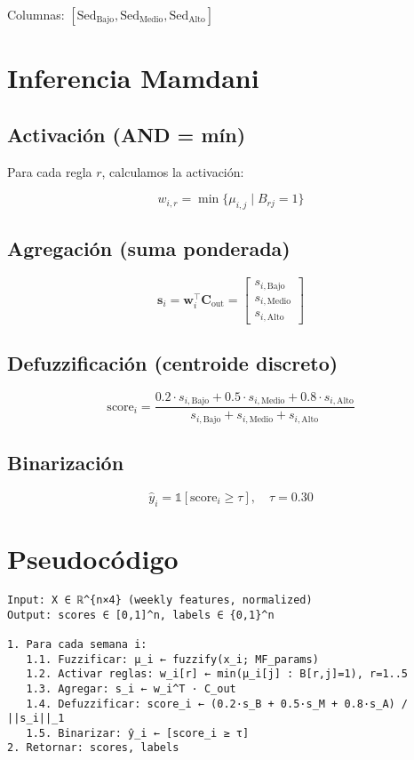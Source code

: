 \documentclass[12pt]{article}
\begin{document}
Columnas: $[\text{Sed}_{\text{Bajo}}, \text{Sed}_{\text{Medio}}, \text{Sed}_{\text{Alto}}]$

\section{Inferencia Mamdani}

\subsection{Activación (AND = mín)}

Para cada regla $r$, calculamos la activación:

\[
w_{i,r} = \min \{ \mu_{i,j} \mid B_{rj} = 1 \}
\]

\subsection{Agregación (suma ponderada)}

\[
\mathbf{s}_i = \mathbf{w}_i^\top \mathbf{C}_{\text{out}} = \begin{bmatrix}
s_{i,\text{Bajo}} \\
s_{i,\text{Medio}} \\
s_{i,\text{Alto}}
\end{bmatrix}
\]

\subsection{Defuzzificación (centroide discreto)}

\[
\text{score}_i = \frac{0.2 \cdot s_{i,\text{Bajo}} + 0.5 \cdot s_{i,\text{Medio}} + 0.8 \cdot s_{i,\text{Alto}}}{s_{i,\text{Bajo}} + s_{i,\text{Medio}} + s_{i,\text{Alto}}}
\]

\subsection{Binarización}

\[
\hat{y}_i = \mathbb{1}[\text{score}_i \ge \tau], \quad \tau = 0.30
\]

\section{Pseudocódigo}

\begin{verbatim}
Input: X ∈ ℝ^{n×4} (weekly features, normalized)
Output: scores ∈ [0,1]^n, labels ∈ {0,1}^n

1. Para cada semana i:
   1.1. Fuzzificar: μ_i ← fuzzify(x_i; MF_params)
   1.2. Activar reglas: w_i[r] ← min(μ_i[j] : B[r,j]=1), r=1..5
   1.3. Agregar: s_i ← w_i^T · C_out
   1.4. Defuzzificar: score_i ← (0.2·s_B + 0.5·s_M + 0.8·s_A) / ||s_i||_1
   1.5. Binarizar: ŷ_i ← [score_i ≥ τ]
2. Retornar: scores, labels
\end{verbatim}
\end{document}
